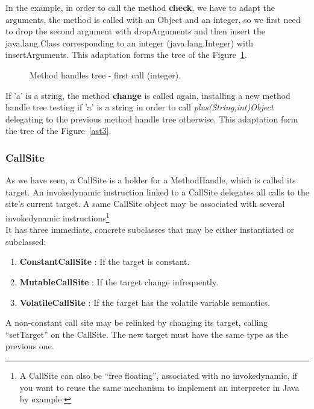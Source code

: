 \documentclass{sig-alternate}
\begin{document}
      In the example, in order to call the method {\bf check}, we have to adapt the arguments,
      the method is called with an Object and an integer, so we first need to drop the second
      argument with dropArguments and then insert the java.lang.Class corresponding to an integer
      (java.lang.Integer) with insertArguments.
      This adaptation forms the tree of the Figure~\ref{ast2}.

      \begin{figure}[!ht]
        \hspace{-.6in} \resizebox{1.3\linewidth}{!}{}
        \caption{Method handles tree - first call (integer).}\vspace{-1em}
        \label{ast2}
      \end{figure}

      If 'a' is a string, the method {\bf change} is called again,
      installing a new method handle tree testing if 'a' is a string in order to call {\it plus(String,int)Object}
      delegating to the previous method handle tree otherwise.
      This adaptation form the tree of the Figure~\ref{ast3}.

      \begin{figure*}[!b]
        \centering \resizebox{.8\linewidth}{!}{}
        \caption{Method handles tree - second call (string).}\vspace{-1em}
        \label{ast3}
      \end{figure*}

    \subsubsection{CallSite}

      As we have seen, a CallSite is a holder for a MethodHandle, which is called its target.
      An invokedynamic instruction linked to a CallSite delegates all calls to the site's current target.
      A same CallSite object may be associated with several invokedynamic
      instructions\footnote{A CallSite can also be ``free floating'', associated with no invokedynamic,
      if you want to reuse the same mechanism to implement an interpreter in Java by example.}\\

      It has three immediate, concrete subclasses that may be either instantiated or subclassed:
      \begin{enumerate}
        \item \textbf{ConstantCallSite} : If the target is constant.
        \item \textbf{MutableCallSite}  : If the target change infrequently.
        \item \textbf{VolatileCallSite} : If the target has the volatile variable semantics.
      \end{enumerate}
      A non-constant call site may be relinked by changing its target, calling ``setTarget'' on the CallSite.
      The new target must have the same type as the previous one.
\end{document}
